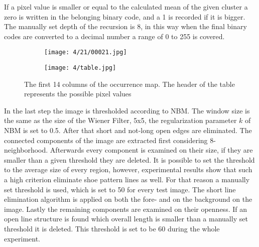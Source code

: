 \documentclass[draft,final]{vutinfth} %
\begin{document}
If a pixel value is smaller or equal to the calculated mean of the given cluster a zero is written in the belonging binary code, and a 1 is recorded if it is bigger.
The manually set depth of the recursion is 8, in this way when the final binary codes are converted to a decimal number a range of 0 to 255 is covered.
\begin{figure}[h]
  \centering
  \begin{subfigure}[b]{0.09\columnwidth}
    \centering
    \texttt{[image: 4/21/00021.jpg]}
  \end{subfigure}
  \begin{subfigure}[b]{0.9\columnwidth}
    \centering
    \texttt{[image: 4/table.jpg]}
  \end{subfigure}
  \caption{The first 14 columns of the occurrence map. The header of the table represents the possible pixel values }
  \label{fig:fans:table} %
\end{figure}
\par
In the last step the image is thresholded according to NBM.
The window size is the same as the size of the Wiener Filter, 5x5, the regularization parameter $k$ of NBM is set to 0.5.
After that short and not-long open edges are eliminated.
The connected components of the image are extracted first considering 8-neighborhood.
Afterwards every component is examined on their size, if they are smaller than a given threshold they are deleted.
It is possible to set the threshold to the average size of every region, however, experimental results show that such a high criterion eliminate shoe pattern lines as well.
For that reason a manually set threshold is used, which is set to 50 for every test image.
The short line elimination algorithm is applied on both the fore- and on the background on the image.
Lastly the remaining components are examined on their openness.
If an open line structure is found which overall length is smaller than a manually set threshold it is deleted.
This threshold is set to be 60 during the whole experiment.
\end{document}
